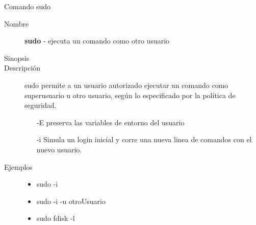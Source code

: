 \begin{frame}[c]{Comando sudo}
  \begin{description}
    \item[Nombre]
      \textbf{sudo} - ejecuta un comando como otro usuario

    \vspace{\baselineskip}
    \item[Sinopsis]
      
    \vspace{\baselineskip}
    \item[Descripción]
      sudo permite a un usuario autorizado ejecutar un comando como
      superusuario u otro usuario, según lo especificado por la política de
      seguridad.

      \begin{itemize}
        \item [-E] preserva las variables de entorno del usuario
        \item [-i] Simula un login inicial y corre una nueva linea de
          comandos con el nuevo usuario.
      \end{itemize}

    \vspace{\baselineskip}
    \item[Ejemplos]
      \begin{itemize}
        \item sudo -i 
        \item sudo -i -u otroUsuario 
        \item sudo fdisk -l
      \end{itemize}
  \end{description}
\end{frame}

